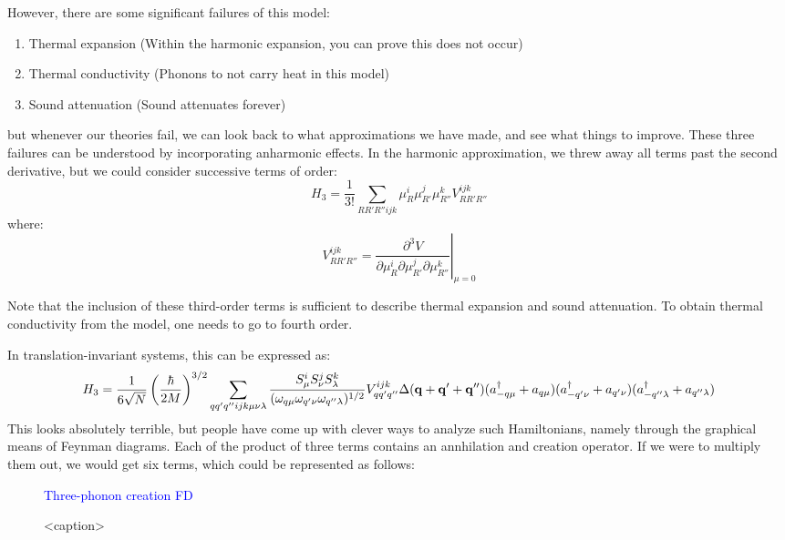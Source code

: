 However, there are some significant failures of this model:
\begin{enumerate}
    \item Thermal expansion (Within the harmonic expansion, you can prove this does not occur)
    \item Thermal conductivity (Phonons to not carry heat in this model)
    \item Sound attenuation (Sound attenuates forever)
\end{enumerate}
but whenever our theories fail, we can look back to what approximations we have made, and see what things to improve. These three failures can be understood by incorporating anharmonic effects. In the harmonic approximation, we threw away all terms past the second derivative, but we could consider successive terms of order:
\begin{equation}
    H_3 = \frac{1}{3!}\sum_{RR'R''ijk}\mu_R^i \mu_{R'}^j \mu_{R''}^{k} V^{ijk}_{RR'R''}
\end{equation}
where:
\begin{equation}
    V^{ijk}_{RR'R''} = \left. \frac{\partial^3 V}{\partial \mu_R^i \partial \mu_{R'}^j \partial \mu_{R''}^k}\right|_{\mu=0}
\end{equation}

Note that the inclusion of these third-order terms is sufficient to describe thermal expansion and sound attenuation. To obtain thermal conductivity from the model, one needs to go to fourth order.

In translation-invariant systems, this can be expressed as:
\begin{equation}
    H_3 = \frac{1}{6\sqrt{N}}\left(\frac{\hbar}{2M}\right)^{3/2}\sum_{qq'q''ijk\mu\nu\lambda}\frac{S_\mu^i S_\nu^j S_\lambda^k}{(\omega_{q\mu}\omega_{q'\nu}\omega_{q''\lambda})^{1/2}}V^{ijk}_{qq'q''}\Delta (\mathbf{q} + \mathbf{q}' + \mathbf{q}'') (a_{-q\mu}^\dagger + a_{q\mu})(a^\dagger_{-q'\nu} + a_{q'\nu})(a^\dagger_{-q''\lambda} + a_{q''\lambda})
\end{equation}
This looks absolutely terrible, but people have come up with clever ways to analyze such Hamiltonians, namely through the graphical means of Feynman diagrams. Each of the product of three terms contains an annhilation and creation operator. If we were to multiply them out, we would get six terms, which could be represented as follows:

\begin{figure}[htbp]
    \centering
    \textcolor{blue}{Three-phonon creation FD}
    \caption{<caption>}
    \label{<label>}
\end{figure}

